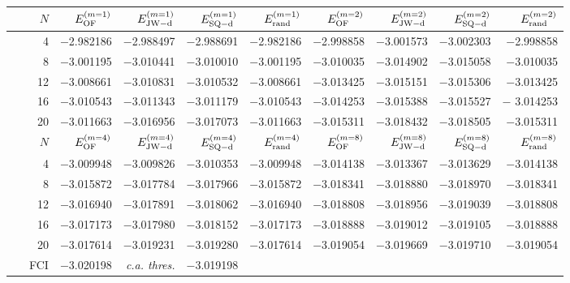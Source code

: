 \documentclass[journal=jctcce,manuscript=article]{achemso}
\begin{document}
\begin{table}[!ht]
\begin{tabular*}{\columnwidth}{@{\extracolsep{\fill}}*{1}{r}*{8}{r}@{}}
 \hline
 \toprule
     $N$    &    $E^{(m=1)}_{\rm{OF}}$    &    $E^{(m=1)}_{\rm{JW-d}}$    &    $E^{(m=1)}_{\rm{SQ-d}}$    &    $E^{(m=1)}_{\rm{rand}}$     &     $E^{(m=2)}_{\rm{OF}}$    &    $E^{(m=2)}_{\rm{JW-d}}$     &   $E^{(m=2)}_{\rm{SQ-d}}$    &     $E^{(m=2)}_{\rm{rand}}$       \\
\midrule
    4    &    $-$2.982186    &    $-$2.988497   &   $-$2.988691   &   $-$2.982186   &    $-$2.998858   &    $-$3.001573    &  $-$3.002303    &   $-$2.998858  \\
    8    &    $-$3.001195	  &    $-$3.010441   &   $-$3.010010   &   $-$3.001195   &    $-$3.010035   &    $-$3.014902     &  $-$3.015058   &   $-$3.010035  \\	
  12    &    $-$3.008661	  &    $-$3.010831   &   $-$3.010532   &   $-$3.008661   &    $-$3.013425   &    $-$3.015151   &   $-$3.015306    &   $-$3.013425  \\
  16    &    $-$3.010543	  &    $-$3.011343   &   $-$3.011179   &   $-$3.010543   &    $-$3.014253   &    $-$3.015388   &   $-$3.015527    &   $-$ 3.014253  \\
  20    &    $-$3.011663    &    $-$3.016956   &   $-$3.017073   &    $-$3.011663  &    $-$3.015311   &    $-$3.018432   &    $-$3.018505   &    $-$3.015311  \\
\hline
\toprule
  $N$    &     $E^{(m=4)}_{\rm{OF}}$    &   $E^{(m=4)}_{\rm{JW-d}}$    &   $E^{(m=4)}_{\rm{SQ-d}}$   &   $E^{(m=4)}_{\rm{rand}}$   &     $E^{(m=8)}_{\rm{OF}}$    &   $E^{(m=8)}_{\rm{JW-d}}$    &   $E^{(m=8)}_{\rm{SQ-d}}$   &   $E^{(m=8)}_{\rm{rand}}$   \\
  \midrule
  4      &   $-$3.009948   &    $-$3.009826    &    $-$3.010353   &   $-$3.009948      &   $-$3.014138    &   $-$3.013367    &   $-$3.013629    &   $-$3.014138  \\
  8      &   $-$3.015872   &    $-$3.017784    &    $-$3.017966   &   $-$3.015872      &   $-$3.018341    &   $-$3.018880    &   $-$3.018970    &   $-$3.018341  \\
  12    &   $-$3.016940   &    $-$3.017891    &   $-$3.018062    &   $-$3.016940      &   $-$3.018808    &   $-$3.018956    &   $-$3.019039    &   $-$3.018808  \\
  16    &   $-$3.017173   &    $-$3.017980    &   $-$3.018152    &   $-$3.017173      &   $-$3.018888    &   $-$3.019012    &   $-$3.019105    &   $-$3.018888  \\ 
  20    &    $-$3.017614  &    $-$3.019231    &   $-$3.019280    &   $-$3.017614     &    $-$3.019054   &    $-$3.019669   &    $-$3.019710     &    $-$3.019054   \\[3pt]
  
~~~FCI       &  $-$3.020198    &   \textit{c.a. thres.}      &    $-$3.019198    \\%
\bottomrule
\hline

\end{tabular*}
\label{table_GSE}
\end{table}
\end{document}
